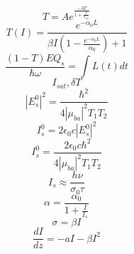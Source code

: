 \documentclass{article}
\begin{document}
$$ T=Ae^{\frac{-\delta T }{1+\frac{I}{I_{sat}}} } $$
$$ T(I)={\frac{e^{-\alpha _0 L}}{\beta I (1- \frac{e^{-\alpha _0 L}}{\alpha _0})+1}} $$
$$ \frac{(1-T)EQ_s}{\hbar \omega} = \int L(t) dt $$
$$ I_{sat} , \delta T $$
$$ |E^0_s|^2=\frac{\hbar^2}{4|\mu_{ba}|^2T_1T_2} $$
$$ I^0_s=2\epsilon_0 c |E^0_s|^2 $$
$$ I^0_s=\frac{2\epsilon_0 c \hbar^2}{4|\mu_{ba}|^2T_1T_2} $$ 
$$ I_s \approx \frac{h\nu}{\sigma_0\tau} $$ 
$$ \alpha = \frac{\alpha_0}{1+\frac{I}{I_s}} $$
$$ \sigma = \beta I $$
$$ \frac{dI}{dz} = -a I - \beta I^2 $$
\end{document}
